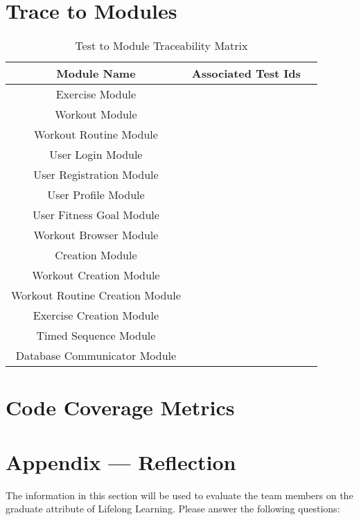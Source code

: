 \documentclass[12pt, titlepage]{article}
\begin{document}
\section{Trace to Modules}		
\begin{table}[H]
	\begin{tabular}{|c|c|c|}
		\hline
		\textbf{Module Name} & \textbf{Associated Test Ids}\\ \hline
		Exercise Module & \\\hline
		Workout Module & \\\hline
		Workout Routine Module & \\\hline
		User Login Module & \\\hline
		User Registration Module & \\\hline
		User Profile Module & \\\hline
		User Fitness Goal Module & \\\hline
		Workout Browser Module & \\\hline
		Creation Module & \\\hline
		Workout Creation Module & \\\hline
		Workout Routine Creation Module & \\\hline
		Exercise Creation Module & \\\hline
		Timed Sequence Module & \\\hline
		Database Communicator Module & \\\hline
		
	\end{tabular}
	\caption{Test to Module Traceability Matrix}
	\label{Table:R_trace}
\end{table}
\section{Code Coverage Metrics}




\newpage{}
\section*{Appendix --- Reflection}

The information in this section will be used to evaluate the team members on the
graduate attribute of Lifelong Learning.  Please answer the following questions:
\end{document}
